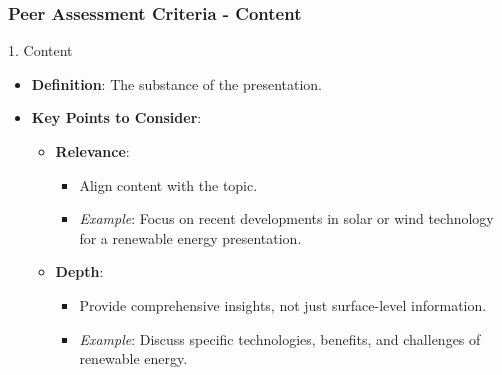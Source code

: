 \documentclass[aspectratio=169]{beamer}
\begin{document}
\begin{frame}[fragile]
    \frametitle{Peer Assessment Criteria - Content}
    \begin{block}{1. Content}
        \begin{itemize}
            \item \textbf{Definition}: The substance of the presentation.
            \item \textbf{Key Points to Consider}:
                \begin{itemize}
                    \item \textbf{Relevance}:
                        \begin{itemize}
                            \item Align content with the topic.
                            \item \textit{Example}: Focus on recent developments in solar or wind technology for a renewable energy presentation.
                        \end{itemize}
                    \item \textbf{Depth}:
                        \begin{itemize}
                            \item Provide comprehensive insights, not just surface-level information.
                            \item \textit{Example}: Discuss specific technologies, benefits, and challenges of renewable energy.
                        \end{itemize}
                \end{itemize}
        \end{itemize}
    \end{block}
\end{frame}
\end{document}
